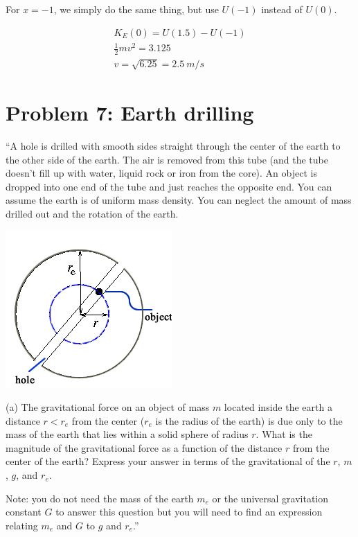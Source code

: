 \documentclass[8.01x]{subfiles}
\begin{document}
For $x = -1$, we simply do the same thing, but use $U(-1)$ instead of $U(0)$.

\begin{align}
K_E(0) = U(1.5) - U(-1)\\
\frac{1}{2} m v^2 = 3.125\\
v = \sqrt{6.25} = \SI{2.5}{m/s}
\end{align}

\section{Problem 7: Earth drilling}

``A hole is drilled with smooth sides straight through the center of the earth to the other side of the earth. The air is removed from this tube (and the tube doesn't fill up with water, liquid rock or iron from the core). An object is dropped into one end of the tube and just reaches the opposite end. You can assume the earth is of uniform mass density. You can neglect the amount of mass drilled out and the rotation of the earth.

\begin{center}
\includegraphics[scale=0.75]{Graphics/h5p7}
\end{center}

(a) The gravitational force on an object of mass $m$ located inside the earth a distance $r < r_e$ from the center ($r_e$ is the radius of the earth) is due only to the mass of the earth that lies within a solid sphere of radius $r$. What is the magnitude of the gravitational force as a function of the distance $r$ from the center of the earth? Express your answer in terms of the gravitational of the $r$, $m$, $g$, and $r_e$.

Note: you do not need the mass of the earth $m_e$ or the universal gravitation constant $G$ to answer this question but you will need to find an expression relating $m_e$ and $G$ to $g$ and $r_e$.''
\end{document}
